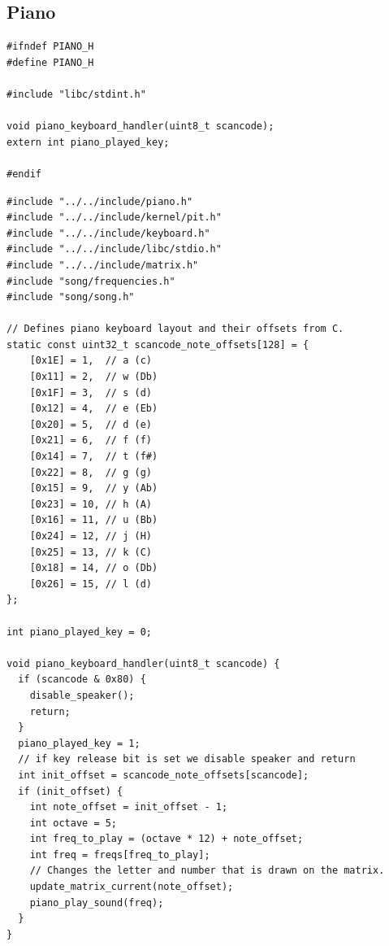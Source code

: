 \documentclass[../main.tex]{subfiles}
\begin{document}
\subsection{Piano}
\label{apx:piano}


\label{lst:piano_h}
\begin{verbatim}
#ifndef PIANO_H
#define PIANO_H

#include "libc/stdint.h"

void piano_keyboard_handler(uint8_t scancode);
extern int piano_played_key;

#endif

\end{verbatim}


\label{lst:piano_c}
\begin{verbatim}
#include "../../include/piano.h"
#include "../../include/kernel/pit.h"
#include "../../include/keyboard.h"
#include "../../include/libc/stdio.h"
#include "../../include/matrix.h"
#include "song/frequencies.h"
#include "song/song.h"

// Defines piano keyboard layout and their offsets from C.
static const uint32_t scancode_note_offsets[128] = {
    [0x1E] = 1,  // a (c)
    [0x11] = 2,  // w (Db)
    [0x1F] = 3,  // s (d)
    [0x12] = 4,  // e (Eb)
    [0x20] = 5,  // d (e)
    [0x21] = 6,  // f (f)
    [0x14] = 7,  // t (f#)
    [0x22] = 8,  // g (g)
    [0x15] = 9,  // y (Ab)
    [0x23] = 10, // h (A)
    [0x16] = 11, // u (Bb)
    [0x24] = 12, // j (H)
    [0x25] = 13, // k (C)
    [0x18] = 14, // o (Db)
    [0x26] = 15, // l (d)
};

int piano_played_key = 0;

void piano_keyboard_handler(uint8_t scancode) {
  if (scancode & 0x80) {
    disable_speaker();
    return;
  }
  piano_played_key = 1;
  // if key release bit is set we disable speaker and return
  int init_offset = scancode_note_offsets[scancode];
  if (init_offset) {
    int note_offset = init_offset - 1;
    int octave = 5;
    int freq_to_play = (octave * 12) + note_offset;
    int freq = freqs[freq_to_play];
    // Changes the letter and number that is drawn on the matrix.
    update_matrix_current(note_offset);
    piano_play_sound(freq);
  }
}

\end{verbatim}
\end{document}
